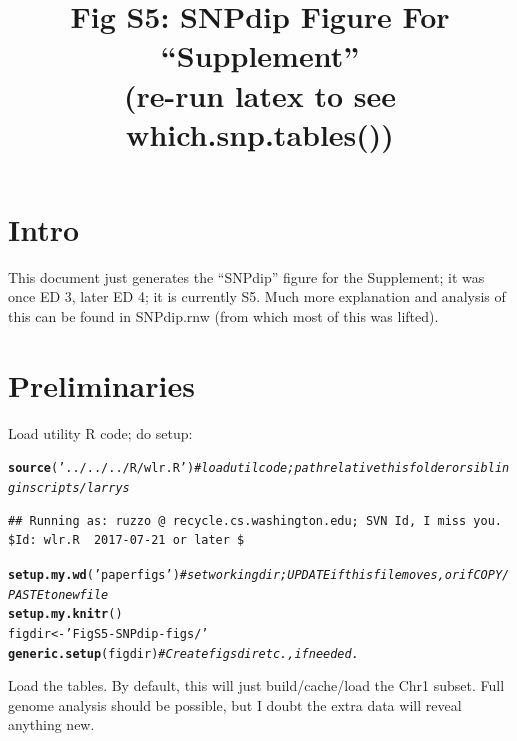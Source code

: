 \documentclass{article}\usepackage[]{graphicx}\usepackage[]{color}
\makeatletter
\newcommand{\hlstr}[1]{\textcolor[rgb]{0.192,0.494,0.8}{#1}}%
\newcommand{\hlcom}[1]{\textcolor[rgb]{0.678,0.584,0.686}{\textit{#1}}}%
\newcommand{\hlstd}[1]{\textcolor[rgb]{0.345,0.345,0.345}{#1}}%
\newcommand{\hlkwb}[1]{\textcolor[rgb]{0.69,0.353,0.396}{#1}}%
\newcommand{\hlkwd}[1]{\textcolor[rgb]{0.737,0.353,0.396}{\textbf{#1}}}%
\newenvironment{kframe}{%
 \def\at@end@of@kframe{}%
 \ifinner\ifhmode%
  \def\at@end@of@kframe{\end{minipage}}%
  \begin{minipage}{\columnwidth}%
 \fi\fi%
 \def\FrameCommand##1{\hskip\@totalleftmargin \hskip-\fboxsep
 \colorbox{shadecolor}{##1}\hskip-\fboxsep
     \hskip-\linewidth \hskip-\@totalleftmargin \hskip\columnwidth}%
 \MakeFramed {\advance\hsize-\width
   \@totalleftmargin\z@ \linewidth\hsize
   \@setminipage}}%
 {\par\unskip\endMakeFramed%
 \at@end@of@kframe}
\newenvironment{knitrout}{}{} %
\providecommand{\whichsnptables}{(re-run latex to see which.snp.tables())}
\makeatother
\begin{document}
\title{Fig S5: SNPdip Figure For ``Supplement''\\\large\whichsnptables}
\maketitle

\tableofcontents

\section{Intro}
\noindent
This document just generates the ``SNPdip'' figure for the Supplement; it was once ED 3, later ED 4;
it is currently S5. Much more explanation and analysis of this can be found in SNPdip.rnw (from
which most of this was lifted).
%
\section{Preliminaries}
%
Load utility R code; do setup:


\begin{knitrout}\footnotesize
{}\color{fgcolor}\begin{kframe}
\begin{alltt}
\hlkwd{source}\hlstd{(}\hlstr{'../../../R/wlr.R'}\hlstd{)} \hlcom{# load util code; path relative this folder or sibling in scripts/larrys }
\end{alltt}
\begin{verbatim}
## Running as: ruzzo @ recycle.cs.washington.edu; SVN Id, I miss you.  $Id: wlr.R  2017-07-21 or later $
\end{verbatim}
\begin{alltt}
\hlkwd{setup.my.wd}\hlstd{(}\hlstr{'paperfigs'}\hlstd{)}   \hlcom{# set working dir; UPDATE if this file moves, or if COPY/PASTE to new file}
\hlkwd{setup.my.knitr}\hlstd{()}
\hlstd{figdir} \hlkwb{<-} \hlstr{'FigS5-SNPdip-figs/'}
\hlkwd{generic.setup}\hlstd{(figdir)}            \hlcom{# Create figs dir etc., if needed.}
\end{alltt}
\end{kframe}
\end{knitrout}

Load the tables.  By default, this will just build/cache/load the Chr1 subset.  Full genome analysis 
should be possible, but I doubt the extra data will reveal anything new.
\end{document}
